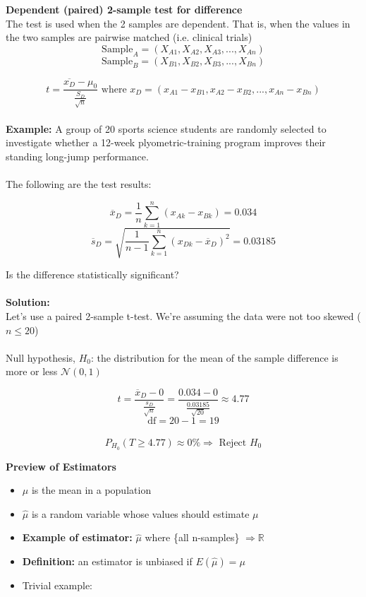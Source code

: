 \documentclass[12pt, letterpaper]{article}
\begin{document}
\textbf{Dependent (paired) 2-sample test for difference} \\
The test is used when the 2 samples are dependent. That is, when the values in the two samples are pairwise matched (i.e. clinical trials)
$$\text{Sample}_A=(X_{A1}, X_{A2}, X_{A3}, ..., X_{An})$$
$$\text{Sample}_B=(X_{B1}, X_{B2}, X_{B3}, ..., X_{Bn})$$



$$ t=\frac{\overline{x_D}-\mu_0}{\frac{S_D}{\sqrt{n}}} \text{ where } x_D = (x_{A1}-x_{B1}, x_{A2}-x_{B2}, ..., x_{An}-x_{Bn})$$ \\

\textbf{Example:} A group of 20 sports science students are randomly selected to investigate whether a 12-week plyometric-training program improves their standing long-jump performance.\\\\The following are the test results:

$$\overline{x}_D = \frac{1}{n}\sum_{k=1}^{n} (x_{Ak}-x_{Bk}) = 0.034$$
$$\overline{s}_D = \sqrt{\frac{1}{n-1}\sum_{k=1}^{n} (x_{Dk}-\overline{x}_D)^2} = 0.03185$$

Is the difference statistically significant?\\\\
\textbf{Solution:}\\
Let's use a paired 2-sample t-test. We're assuming the data were not too skewed ($n\leq20$)\\\\
Null hypothesis, $H_0$: the distribution for the mean of the sample difference is more or less $\mathcal{N}(0,1)$

$$t=\frac{\overline{x}_D-0}{\frac{s_D}{\sqrt{n}}} = \frac{0.034-0}{\frac{0.03185}{\sqrt{20}}}\approx 4.77$$
$$\text{df}=20-1=19$$\
$$P_{H_0}(T\geq4.77)\approx0\%\Rightarrow\text{ Reject }H_0$$ 

\pagebreak
\textbf{Preview of Estimators}
\begin{itemize}
    \item $\mu$ is the mean in a population
    \item $\hat{\mu}$ is a random variable whose values should estimate $\mu$
    \item \textbf{Example of estimator:} $\hat{\mu}$ where \{all n-samples\} $\Rightarrow \mathbb{R}$ 
    \item \textbf{Definition:} an estimator is unbiased if $E(\hat{\mu})=\mu$
    \item Trivial example: 
\end{itemize}







\end{document}
